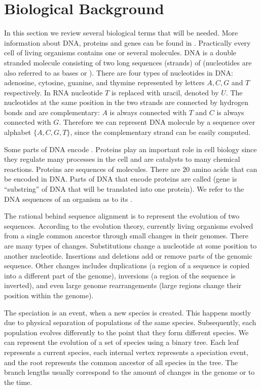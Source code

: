\section{Biological Background}\label{SECTION:BIOINTRO}

In this section we review several biological terms that will be needed. More
information about DNA, proteins and genes can be found in
\cite{BiologyForDummies, UnderstandingBioinformatics}. Practically every cell of living
organisms contains one or several  molecules. DNA is a double
stranded molecule consisting of two long sequences (strands) of
 (nucleotides are also referred to as bases or
). There are four types of nucleotides in DNA: adenosine,
cytosine, guanine, and thymine represented by letters $A,C,G$ and $T$
respectively. In RNA nucleotide $T$ is replaced with uracil, denoted by $U$.
The nucleotides at the same position in
the two strands are connected by hydrogen bonds and are complementary: $A$ is
always connected with $T$ and $C$ is always connected with $G$. Therefore we
can represent DNA molecule by a sequence over alphabet $\{A,C,G,T\}$, since the
complementary strand can be easily computed.

Some parts of DNA encode . Proteins play an important role in cell
biology since  they regulate many processes in the cell and are catalysts to
many chemical reactions. Proteins are sequences of 
molecules. There are $20$ amino acids that can be encoded in DNA. Parts of DNA
that encode proteins are called  (gene is ``substring'' of
DNA that will be translated into one protein). We refer to the DNA
sequences of an organism as to its .

The rational behind sequence alignment is to represent the evolution of two
sequences. According to the evolution theory, currently living organisms
evolved from a single common ancestor through small changes in their genomes.
There are many types of changes.  Substitutions change  a nucleotide at some
position to another nucleotide.  Insertions and deletions add or remove parts
of the genomic sequence. Other changes includes duplications (a region of a
sequence is copied into a different part of the genome), inversions (a region
of the sequence is inverted), and even large genome rearrangements (large
regions  change their position within the genome). 

The speciation is an event, when a new species is created. This happens mostly
due to physical separation of populations of the same species. Subsequently, each
population evolves differently to the point that  they form
different species. We can represent the evolution of a set of species using a binary
tree. Each leaf represents a current species, each internal vertex represents
a speciation event, and the root represents the common ancestor of all species in
the tree. The branch lengths usually correspond to the amount of changes in
the genome or to the time. 

